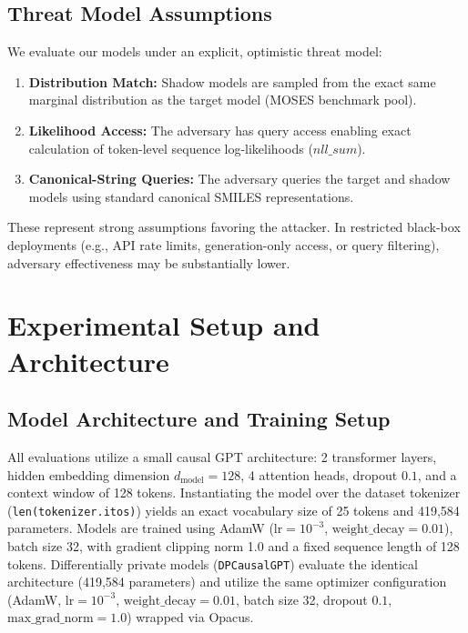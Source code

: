 \documentclass[10pt,journal,compsoc]{IEEEtran}
\begin{document}
\subsection{Threat Model Assumptions}
We evaluate our models under an explicit, optimistic threat model:
\begin{enumerate}
    \item \textbf{Distribution Match:} Shadow models are sampled from the exact same marginal distribution as the target model (MOSES benchmark pool).
    \item \textbf{Likelihood Access:} The adversary has query access enabling exact calculation of token-level sequence log-likelihoods ($nll\_sum$).
    \item \textbf{Canonical-String Queries:} The adversary queries the target and shadow models using standard canonical SMILES representations.
\end{enumerate}
These represent strong assumptions favoring the attacker. In restricted black-box deployments (e.g., API rate limits, generation-only access, or query filtering), adversary effectiveness may be substantially lower.

\section{Experimental Setup and Architecture}
\subsection{Model Architecture and Training Setup}
All evaluations utilize a small causal GPT architecture: 2 transformer layers, hidden embedding dimension $d_{\text{model}} = 128$, 4 attention heads, dropout $0.1$, and a context window of 128 tokens. Instantiating the model over the dataset tokenizer (\texttt{len(tokenizer.itos)}) yields an exact vocabulary size of 25 tokens and 419,584 parameters. Models are trained using AdamW ($\text{lr} = 10^{-3}$, $\text{weight\_decay} = 0.01$), batch size 32, with gradient clipping norm 1.0 and a fixed sequence length of 128 tokens. Differentially private models (\texttt{DPCausalGPT}) evaluate the identical architecture (419,584 parameters) and utilize the same optimizer configuration (AdamW, $\text{lr} = 10^{-3}$, $\text{weight\_decay} = 0.01$, batch size 32, dropout $0.1$, $\text{max\_grad\_norm} = 1.0$) wrapped via Opacus.
\end{document}
